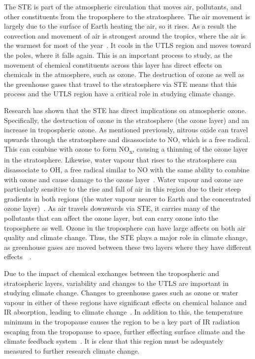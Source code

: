 The STE is part of the atmospheric circulation that moves air, pollutants, and other constituents from the troposphere to the stratosphere. The air movement is largely due to the surface of Earth heating the air, so it rises. As a result the convection and movement of air is strongest around the tropics, where the air is the warmest for most of the year~\citep{STE_text}. It cools in the UTLS region and moves toward the poles, where it falls again. This is an important process to study, as the movement of chemical constituents across this layer has direct effects on chemicals in the atmosphere, such as ozone. The destruction of ozone as well as the greenhouse gases that travel to the stratosphere via STE means that this process and the UTLS region have a critical role in studying climate change.

Research has shown that the STE has direct implications on atmospheric ozone. Specifically, the destruction of ozone in the stratosphere (the ozone layer) and an increase in tropospheric ozone. As mentioned previously, nitrous oxide can travel upwards through the stratosphere and disassociate to NO, which is a free radical. This can combine with ozone to form NO\textsubscript{x}, causing a thinning of the ozone layer in the stratosphere. Likewise, water vapour that rises to the stratosphere can disassociate to OH, a free radical similar to NO with the same ability to combine with ozone and cause damage to the ozone layer~\citep{WMO_ozone}. Water vapour and ozone are particularly sensitive to the rise and fall of air in this region due to their steep gradients in both regions (the water vapour nearer to Earth and the concentrated ozone layer)~\citep{GLORIA_objectives}. As air travels downwards via STE, it carries many of the pollutants that can affect the ozone layer, but can carry ozone into the troposphere as well. Ozone in the troposphere can have large affects on both air quality and climate change. Thus, the STE plays a major role in climate change, as greenhouse gases are moved between these two layers where they have different effects~\citep{STE_text}~\citep{UTLS_STE}.

Due to the impact of chemical exchanges between the tropospheric and stratospheric layers, variability and changes to the UTLS are important in studying climate change. Changes to greenhouse gases such as ozone or water vapour in either of these regions have significant effects on chemical balance and IR absorption, leading to climate change~\citep{climate_change_2007}. In addition to this, the temperature minimum in the tropopause causes the region to be a key part of IR radiation escaping from the tropopause to space, further effecting surface climate and the climate feedback system~\citep{ext_utls}. It is clear that this region must be adequately measured to further research climate change.

